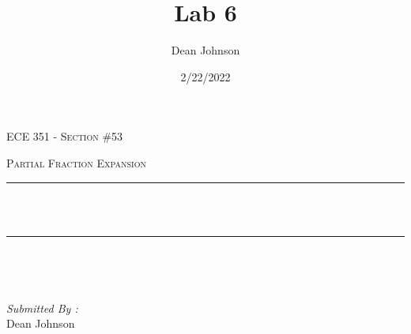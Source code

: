 \documentclass[12pt]{report}
\title{Lab 6}
\author{ Dean Johnson}
\date{2/22/2022}
\makeatletter
\let\thetitle\@title
\makeatother
\begin{document}

\begin{titlepage}
	\centering
    \vspace*{0.5 cm}
\begin{center}    \textsc{\Large   ECE 351 - Section \#53 }\\[2.0 cm]	\end{center}%
	\textsc{\Large Partial Fraction Expansion}\\[0.5 cm]				%
	\rule{\linewidth}{0.2 mm} \\[0.4 cm]
	{ \huge \bfseries \thetitle}\\
	\rule{\linewidth}{0.2 mm} \\[1.5 cm]
	
	\begin{minipage}{0.4\textwidth}
		\begin{flushleft} \large
			\end{flushleft}
			\end{minipage}~
			\begin{minipage}{0.4\textwidth}
            
			\begin{flushright} \large
			\emph{Submitted By :} \\
			Dean Johnson  
		\end{flushright}
           
	\end{minipage}\\[2 cm]
	
    
    
    
    
	
\end{titlepage}


\tableofcontents
\pagebreak

\renewcommand{\thesection}{\arabic{section}}
\end{document}

